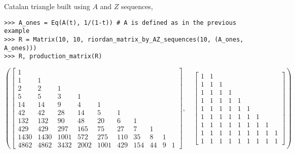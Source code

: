 \begin{example}
Catalan triangle built using $A$ and $Z$ sequences,
\begin{verbatim}
>>> A_ones = Eq(A(t), 1/(1-t)) # A is defined as in the previous example
>>> R = Matrix(10, 10, riordan_matrix_by_AZ_sequences(10, (A_ones, A_ones)))
>>> R, production_matrix(R)
\end{verbatim}
\begin{displaymath}
\left ( \left[\begin{matrix}1 &   &   &   &   &   &   &   &   &  \\1 & 1 &   &   &   &   &   &   &   &  \\2 & 2 & 1 &   &   &   &   &   &   &  \\5 & 5 & 3 & 1 &   &   &   &   &   &  \\14 & 14 & 9 & 4 & 1 &   &   &   &   &  \\42 & 42 & 28 & 14 & 5 & 1 &   &   &   &  \\132 & 132 & 90 & 48 & 20 & 6 & 1 &   &   &  \\429 & 429 & 297 & 165 & 75 & 27 & 7 & 1 &   &  \\1430 & 1430 & 1001 & 572 & 275 & 110 & 35 & 8 & 1 &  \\4862 & 4862 & 3432 & 2002 & 1001 & 429 & 154 & 44 & 9 & 1\end{matrix}\right], \quad \left[\begin{matrix}1 & 1 &   &   &   &   &   &   &  \\1 & 1 & 1 &   &   &   &   &   &  \\1 & 1 & 1 & 1 &   &   &   &   &  \\1 & 1 & 1 & 1 & 1 &   &   &   &  \\1 & 1 & 1 & 1 & 1 & 1 &   &   &  \\1 & 1 & 1 & 1 & 1 & 1 & 1 &   &  \\1 & 1 & 1 & 1 & 1 & 1 & 1 & 1 &  \\1 & 1 & 1 & 1 & 1 & 1 & 1 & 1 & 1\\1 & 1 & 1 & 1 & 1 & 1 & 1 & 1 & 1\end{matrix}\right]\right )
\end{displaymath}
\end{example}

